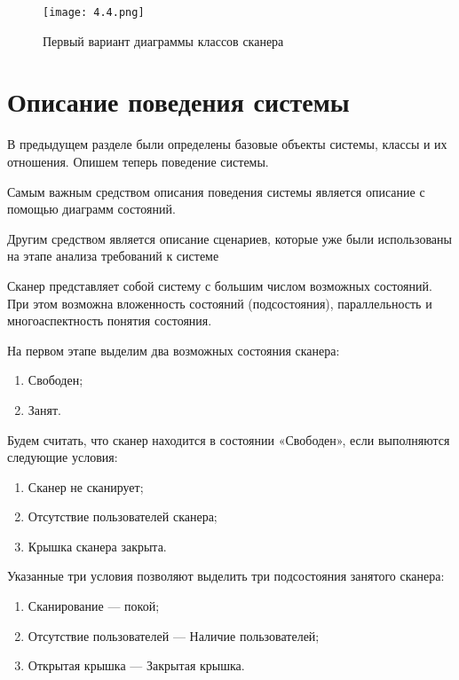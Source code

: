\documentclass[12pt]{article}
\let\oldsection\section
\renewcommand{\section}[1]{
    \oldsection{#1}
    \setcounter{table}{0}
    \setcounter{figure}{0}
}
\begin{document}
    \begin{figure}[h]
        \texttt{[image: 4.4.png]}
        \centering
        \caption{Первый вариант диаграммы классов сканера}
    \end{figure}

    \newpage

    \section{Описание поведения системы}

    В предыдущем разделе были определены базовые объекты системы, классы и их отношения. Опишем теперь поведение системы.

    Самым важным средством описания поведения системы является описание с помощью диаграмм состояний.

    Другим средством является описание сценариев, которые уже были использованы на этапе анализа требований к системе

    Сканер представляет собой систему с большим числом возможных состояний. При этом возможна вложенность состояний (подсостояния), параллельность и многоаспектность понятия состояния.

    На первом этапе выделим два возможных состояния сканера:

    \begin{enumerate}
        \item Свободен;
        \item Занят.
    \end{enumerate}

    Будем считать, что сканер находится в состоянии «Свободен», если выполняются следующие условия:

    \begin{enumerate}
        \item Сканер не сканирует;
        \item Отсутствие пользователей сканера;
        \item Крышка сканера закрыта.
    \end{enumerate}

    Указанные три условия позволяют выделить три подсостояния занятого сканера:

    \begin{enumerate}
        \item Сканирование --- покой;
        \item Отсутствие пользователей --- Наличие пользователей;
        \item Открытая крышка --- Закрытая крышка.
    \end{enumerate}
\end{document}
